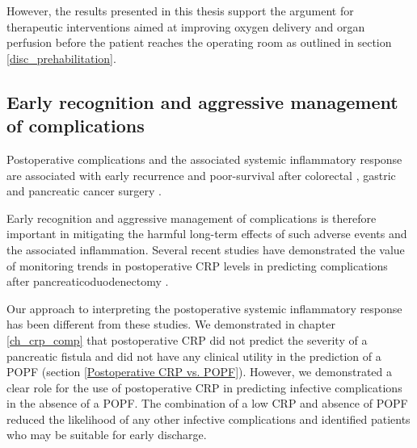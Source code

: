 However, the results presented in this thesis support the argument for therapeutic interventions aimed at improving oxygen delivery and organ perfusion before the patient reaches the operating room as outlined in section \ref{disc_prehabilitation}.

\subsection{Early recognition and aggressive management of complications}

Postoperative complications and the associated systemic inflammatory response are associated with early recurrence and poor-survival after colorectal \parencite{artinyan_infectious_2015, mcardle_impact_2005}, gastric \parencite{hayashi_impact_2015,kubota_prognostic_2014}  and pancreatic cancer surgery \parencite{aoyama_impact_2015, kamphues_postoperative_2012}.

Early recognition and aggressive management of complications is therefore important in mitigating the harmful long-term effects of such adverse events and the associated inflammation. 
Several recent studies have demonstrated the value of monitoring trends in postoperative CRP levels in predicting complications after pancreaticoduodenectomy \parencite{hiyoshi_usefulness_2013, ansorge_diagnostic_2014, kosaka_multivariate_2014}.

Our approach to interpreting the postoperative systemic inflammatory response has been different from these studies. 
We demonstrated in chapter \ref{ch_crp_comp} that postoperative CRP did not predict the severity of a pancreatic fistula and did not have any clinical utility in the prediction of a POPF (section \ref{Postoperative CRP vs. POPF}).
However, we demonstrated a clear role for the use of postoperative CRP in predicting infective complications in the absence of a POPF. 
The combination of a low CRP and absence of POPF reduced the likelihood of any other infective complications and identified patients who may be suitable for early discharge.

